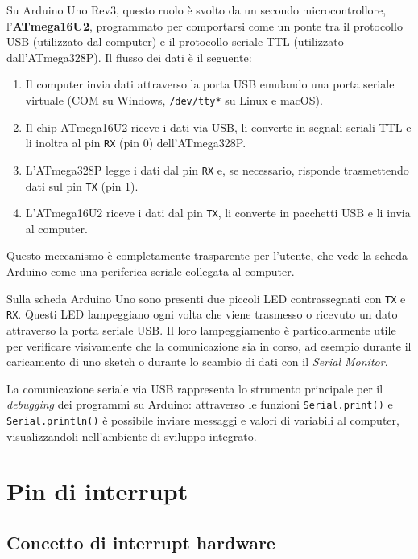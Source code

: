Su Arduino Uno Rev3, questo ruolo è svolto da un secondo microcontrollore, l'\textbf{ATmega16U2}, programmato per comportarsi come un ponte tra il protocollo USB (utilizzato dal computer) e il protocollo seriale TTL (utilizzato dall'ATmega328P). Il flusso dei dati è il seguente:

\begin{enumerate}
    \item Il computer invia dati attraverso la porta USB emulando una porta seriale virtuale (COM su Windows, \texttt{/dev/tty*} su Linux e macOS).
    \item Il chip ATmega16U2 riceve i dati via USB, li converte in segnali seriali TTL e li inoltra al pin \texttt{RX} (pin 0) dell'ATmega328P.
    \item L'ATmega328P legge i dati dal pin \texttt{RX} e, se necessario, risponde trasmettendo dati sul pin \texttt{TX} (pin 1).
    \item L'ATmega16U2 riceve i dati dal pin \texttt{TX}, li converte in pacchetti USB e li invia al computer.
\end{enumerate}

Questo meccanismo è completamente trasparente per l'utente, che vede la scheda Arduino come una periferica seriale collegata al computer.

\begin{tcolorbox}[colback=blue!4, colframe=blue!60, title=\textbf{Nota – I LED TX e RX sulla scheda}]
    Sulla scheda Arduino Uno sono presenti due piccoli LED contrassegnati con \texttt{TX} e \texttt{RX}. Questi LED lampeggiano ogni volta che viene trasmesso o ricevuto un dato attraverso la porta seriale USB. Il loro lampeggiamento è particolarmente utile per verificare visivamente che la comunicazione sia in corso, ad esempio durante il caricamento di uno sketch o durante lo scambio di dati con il \textit{Serial Monitor}.
\end{tcolorbox}

La comunicazione seriale via USB rappresenta lo strumento principale per il \textit{debugging} dei programmi su Arduino: attraverso le funzioni \texttt{Serial.print()} e \texttt{Serial.println()} è possibile inviare messaggi e valori di variabili al computer, visualizzandoli nell'ambiente di sviluppo integrato.

\section{Pin di interrupt}
\subsection*{Concetto di interrupt hardware}
